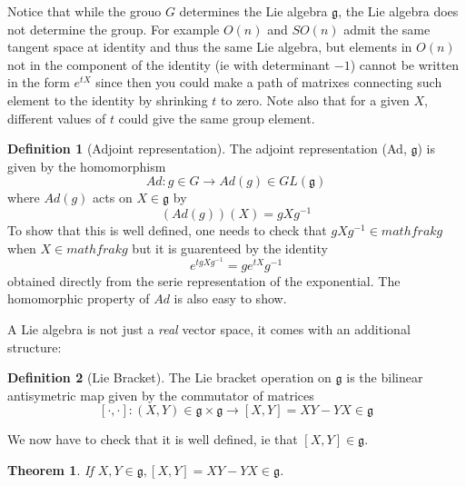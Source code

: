 \documentclass[11pt,a4paper]{article}
\newtheorem{theorem}{Theorem}[section]
\theoremstyle{definition}
\newtheorem{definition}{Definition}[section]
\numberwithin{equation}{section}
\begin{document}
Notice that while the grouo $G$ determines the Lie algebra $\mathfrak{g}$, the Lie algebra does not determine the group. For example $O(n)$ and $SO(n)$ admit the same tangent space at identity and thus the same Lie algebra, but elements in $O(n)$ not in the component of the identity (ie with determinant $-1$) cannot be written in the form $e^{tX}$ since then you could make a path of matrixes connecting such element to the identity by shrinking $t$ to zero.
Note also that for a given $X$, different values of $t$ could give the same group element.
\begin{definition}[Adjoint representation]
    The adjoint representation (Ad, $\mathfrak{g}$) is given by the homomorphism
    \begin{equation*}
        Ad:g\in G \rightarrow Ad(g)\in GL(\mathfrak{g})
    \end{equation*}
    where $Ad(g)$ acts on $X\in \mathfrak{g}$ by
    \begin{equation*}
        (Ad(g))(X) = gXg^{-1}
    \end{equation*}
    To show that this is well defined, one needs to check that $gXg^{-1} \in mathfrak{g}$ when $X \in mathfrak{g}$ but it is guarenteed by the identity
    \begin{equation*}
        e^{tgXg^{-1}} = ge^{tX}g^{-1}
    \end{equation*}
    obtained directly from the serie representation of the exponential.
    The homomorphic property of $Ad$ is also easy to show.
\end{definition}
A Lie algebra is not just a \textit{real} vector space, it comes with an additional structure:
\begin{definition}[Lie Bracket]
    The Lie bracket operation on $ \mathfrak{g}$ is the bilinear antisymetric map given by the commutator of matrices
    \begin{equation*}
        \left[\cdot,\cdot\right]:(X,Y)\in \mathfrak{g} \times \mathfrak{g} \rightarrow \left[X,Y\right] = XY -YX \in \mathfrak{g}
    \end{equation*}
\end{definition}
We now have to check that it is well defined, ie that $\left[X,Y\right]\in \mathfrak{g}$.
\begin{theorem}
    If $X,Y \in  \mathfrak{g}, \left[X,Y\right] = XY - YX \in \mathfrak{g}$.
\end{theorem}
\end{document}
